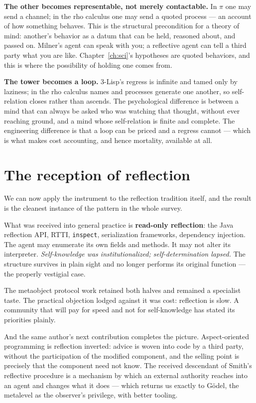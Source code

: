 \textbf{The other becomes representable, not merely contactable.}
In $\pi$ one may send a channel; in the rho calculus one may send a
quoted process --- an account of how something behaves.
This is the structural precondition for a theory of mind: another's
behavior as a datum that can be held, reasoned about, and passed on.
Milner's agent can speak with you; a reflective agent can tell a
third party what you are like.
Chapter~\ref{ch:sci}'s hypotheses are quoted behaviors, and this is
where the possibility of holding one comes from.

\textbf{The tower becomes a loop.}
3-Lisp's regress is infinite and tamed only by laziness; in the rho
calculus names and processes generate one another, so self-relation
closes rather than ascends.
The psychological difference is between a mind that can always be
asked who was watching that thought, without ever reaching ground,
and a mind whose self-relation is finite and complete.
The engineering difference is that a loop can be priced and a
regress cannot --- which is what makes cost accounting, and hence
mortality, available at all.

\section{The reception of reflection}
\label{psy:sec:reception-of-reflection}

We can now apply the instrument to the reflection tradition itself,
and the result is the cleanest instance of the pattern in the whole
survey.

What was received into general practice is \textbf{read-only
reflection}: the Java reflection API, RTTI, \texttt{inspect},
serialization frameworks, dependency injection.
The agent may enumerate its own fields and methods.
It may not alter its interpreter.
\emph{Self-knowledge was institutionalized; self-determination
lapsed.}
The structure survives in plain sight and no longer performs its
original function --- the properly vestigial case.

The metaobject protocol work \cite{kiczales1991} retained both
halves and remained a specialist taste.
The practical objection lodged against it was cost: reflection is
slow.
A community that will pay for speed and not for self-knowledge has
stated its priorities plainly.

And the same author's next contribution completes the picture.
Aspect-oriented programming \cite{kiczales1997} is reflection
inverted: advice is woven into code by a third party, without the
participation of the modified component, and the selling point is
precisely that the component need not know.
The received descendant of Smith's reflective procedure is a
mechanism by which an external authority reaches into an agent and
changes what it does --- which returns us exactly to G\"odel, the
metalevel as the observer's privilege, with better tooling.


